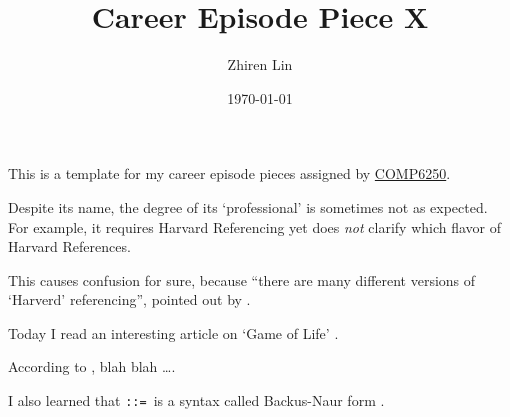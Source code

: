 \documentclass[12pt,a4paper]{article}
\title{Career Episode Piece X}  %
\author{Zhiren Lin}
\date{\today}
\begin{document}
\maketitle
This is a template for my career episode pieces assigned by \href{https://programsandcourses.anu.edu.au/2021/course/comp6250}{COMP6250}.

Despite its name, the degree of its `professional' is sometimes not as expected. For example,
it requires Harvard Referencing yet does \emph{not} clarify which flavor of Harvard References.

This causes confusion for sure, because ``there are many different versions of `Harverd' referencing'', pointed out by \textcite{site:ubathlib}.

Today I read an interesting article on `Game of Life' \parencite{gardner1970}.

According to \textcite{wiki:gol}, blah blah \ldots.

I also learned that \texttt{::=}\ is a syntax called Backus-Naur form \parencite{wiki:bnf}.
\printbibliography
\end{document}
